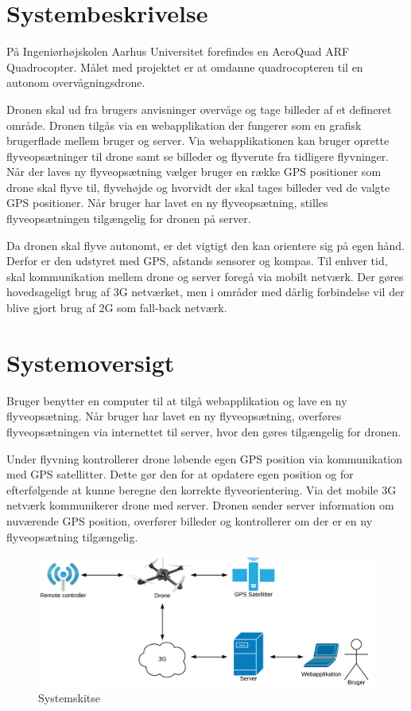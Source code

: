 \section{Systembeskrivelse}
På Ingeniørhøjskolen Aarhus Universitet forefindes en AeroQuad ARF Quadrocopter. 
Målet med projektet er at omdanne quadrocopteren til en autonom overvågningsdrone.

Dronen skal ud fra brugers anvisninger overvåge og tage billeder af et defineret område. Dronen tilgås via en webapplikation der fungerer som en grafisk brugerflade mellem bruger og server.  
Via webapplikationen kan bruger oprette flyveopsætninger til drone samt se billeder og flyverute fra tidligere flyvninger. 
Når der laves ny flyveopsætning vælger bruger en række GPS positioner som drone skal flyve til, flyvehøjde og hvorvidt der skal tages billeder ved de valgte GPS positioner. Når bruger har lavet en ny flyveopsætning, stilles flyveopsætningen tilgængelig for dronen på server.  

Da dronen skal flyve autonomt, er det vigtigt den kan orientere sig på egen hånd. Derfor er den udstyret med GPS, afstands sensorer og kompas.
Til enhver tid, skal kommunikation mellem drone og server foregå via mobilt netværk. Der gøres hovedsageligt brug af 3G netværket, men i områder med dårlig forbindelse vil der blive gjort brug af 2G som fall-back netværk. 



\section{Systemoversigt}
Bruger benytter en computer til at tilgå webapplikation og lave en ny flyveopsætning. Når bruger har lavet en ny flyveopsætning, overføres flyveopsætningen via internettet til server, hvor den gøres tilgængelig for dronen.
 
Under flyvning kontrollerer drone løbende egen GPS position via kommunikation med GPS satellitter. Dette gør den for at opdatere egen position og for efterfølgende at kunne beregne den korrekte flyveorientering. 
Via det mobile 3G netværk kommunikerer drone med server. Dronen sender server information om nuværende GPS position, overfører billeder og kontrollerer om der er en ny flyveopsætning tilgængelig. 

\vspace{-5pt}
\begin{figure}[H]
\centering
\includegraphics[width=1\textwidth]{Billeder/Projektbeskrivelse.png}
\vspace{-.5cm}
\caption{Systemskitse}
\label{fig:Systemskitse}
\end{figure}